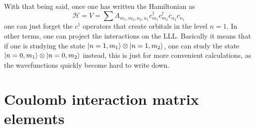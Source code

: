 		With that being said, once one has written the Hamiltonian as
		\begin{equation}
		    \mathcal{H}=V=\sum A_{m_1,m_2,n_2,n_1}c^\dagger_{m_1}c^\dagger_{m_2}c_{n_2}c_{n_1}
		\end{equation}
		one can just forget the $c^\dagger$ operators that create orbitals in the level $n=1$. In other terms, one can project the interactions on the LLL. Basically it means that if one is studying the state $\ket{n=1, m_1}\otimes\ket{n=1,m_2}$, one can study the state $\ket{n=0, m_1}\otimes\ket{n=0, m_2}$ instead, this is just for more convenient calculations, as the wavefunctions quickly become hard to write down.

	\section{Coulomb interaction matrix elements}
	
